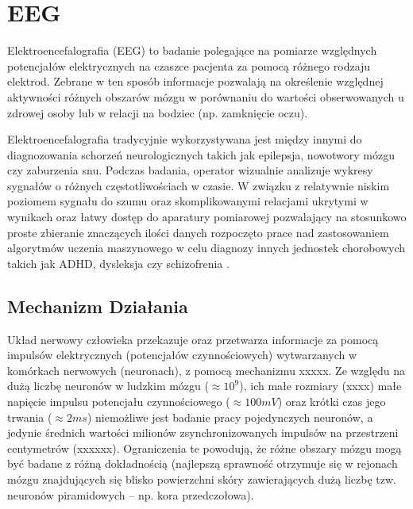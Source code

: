 \documentclass{./assets/wfis}
\begin{document}
\section{EEG}
Elektroencefalografia (EEG) to badanie polegające na pomiarze względnych potencjałów elektrycznych na czaszce pacjenta za pomocą różnego rodzaju elektrod. Zebrane w ten sposób informacje pozwalają na określenie względnej aktywności różnych obszarów mózgu w porównaniu do wartości obserwowanych u zdrowej osoby lub w relacji na bodziec (np. zamknięcie oczu).

Elektroencefalografia tradycyjnie wykorzystywana jest między innymi do diagnozowania schorzeń neurologicznych takich jak epilepsja, nowotwory mózgu czy zaburzenia snu. Podczas badania, operator wizualnie analizuje wykresy sygnałów o różnych częstotliwościach w czasie. W związku z relatywnie niskim poziomem sygnału do szumu oraz skomplikowanymi relacjami ukrytymi w wynikach oraz łatwy dostęp do aparatury pomiarowej pozwalający na stosunkowo proste zbieranie znaczących ilości danych rozpoczęto prace nad zastosowaniem algorytmów uczenia maszynowego w celu diagnozy innych jednostek chorobowych takich jak ADHD, dysleksja czy schizofrenia \cite{ahire_comprehensive_2022, joshi_review_2021, clarke_eeg_2002}.

\subsection{Mechanizm Działania}

Układ nerwowy człowieka przekazuje oraz przetwarza informacje za pomocą impulsów elektrycznych (potencjałów czynnościowych) wytwarzanych w komórkach nerwowych (neuronach), z pomocą mechanizmu xxxxx. Ze względu na dużą liczbę neuronów w ludzkim mózgu ($\approx10^9$\cite{herculano-houzel_human_2009}), ich małe rozmiary (xxxx) małe napięcie impulsu potencjału czynnościowego ($\approx100mV$\cite{biga_anatomy_2019}) oraz krótki czas jego trwania ($\approx2ms$\cite{biga_anatomy_2019}) niemożliwe jest badanie pracy pojedynczych neuronów, a jedynie średnich wartości milionów zsynchronizowanych impulsów na przestrzeni centymetrów (xxxxxx). Ograniczenia te powodują, że różne obszary mózgu mogą być badane z różną dokładnością (najlepszą sprawność otrzymuje się w rejonach mózgu znajdujących się blisko powierzchni skóry zawierających dużą liczbę tzw. neuronów piramidowych – np. kora przedczołowa).
\end{document}
